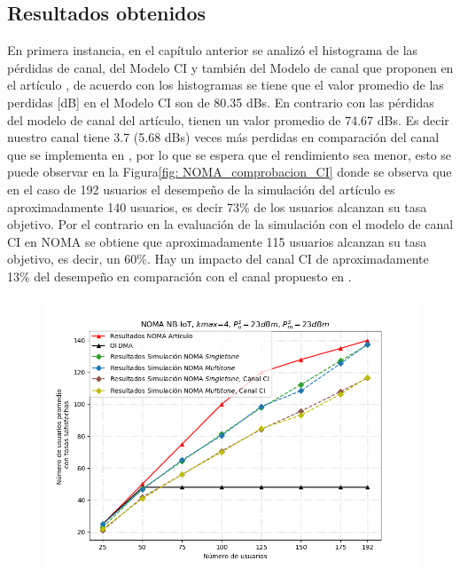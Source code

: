 \subsection{Resultados obtenidos}
En primera instancia, en el capítulo anterior se analizó el histograma de las pérdidas de canal, del Modelo CI y también del Modelo de canal que proponen en el artículo \parencite{Shahini2019} , de acuerdo con los histogramas se tiene que el valor promedio de las perdidas [dB] en el Modelo CI son de 80.35 dBs. En contrario con las pérdidas del modelo de canal del artículo, tienen un valor promedio de 74.67 dBs. Es decir nuestro canal tiene 3.7 (5.68 dBs) veces más perdidas en comparación del canal que se implementa en \parencite{Shahini2019}, por lo que se espera que el rendimiento sea menor, esto se puede observar en la Figura\ref{fig: NOMA_comprobacion_CI} donde se observa que en el caso de 192 usuarios el desempeño de la simulación del artículo es aproximadamente 140 usuarios, es decir 73\% de los usuarios alcanzan su tasa objetivo. Por el contrario en la evaluación de la simulación con el modelo de canal CI en NOMA se obtiene que aproximadamente 115 usuarios alcanzan su tasa objetivo, es decir, un 60\%. Hay un impacto del canal CI de aproximadamente 13\% del desempeño en comparación con el canal propuesto en \parencite{Shahini2019}.\newline


\begin{figure}[th]
    \centering
    \includegraphics[scale=.7]{Figures/ResultadosNOMA/NOMA_comprobacion_CI.png}
    \decoRule
    \caption[]{}
    \label{fig:NOMA_comprobacion_CI}
\end{figure}

